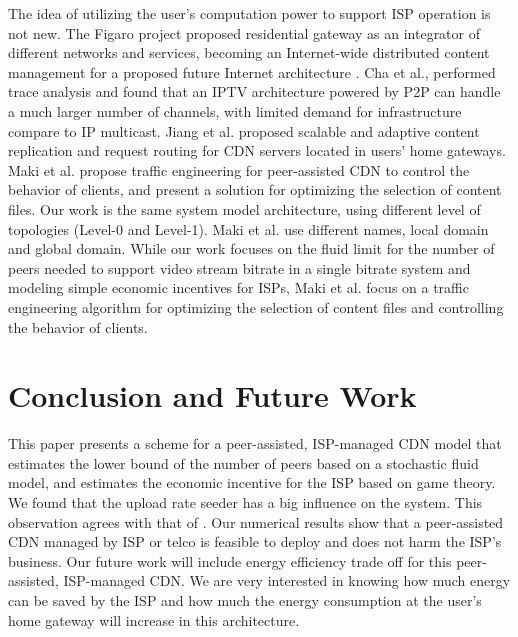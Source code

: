 \documentclass[paper]{ieice}
\begin{document}
The idea of utilizing the user's computation power to support ISP
operation is not new.  The Figaro project \cite{figaro} proposed
residential gateway as an integrator of different networks and
services, becoming an Internet-wide distributed content management for
a proposed future Internet architecture \cite{figaro}.  Cha et
al.,\cite{Cha:2008:NTP:1855641.1855646} performed trace analysis and
found that an IPTV architecture powered by P2P can handle a much
larger number of channels, with limited demand for infrastructure
compare to IP multicast.  Jiang et al.
\cite{Jiang:2012:OMD:2413176.2413193} proposed scalable and adaptive
content replication and request routing for CDN servers located in
users' home gateways.  Maki et al.\cite{NaoyaMAKI2012} propose traffic
engineering for peer-assisted CDN to control the behavior of clients,
and present a solution for optimizing the selection of content files.
Our work is the same system model architecture, using different level
of topologies (Level-0 and Level-1).  Maki et al. use different names,
local domain and global domain.  While our work focuses on the fluid
limit for the number of peers needed to support video stream bitrate
in a single bitrate system and modeling simple economic incentives for
ISPs, Maki et al. focus on a traffic engineering algorithm for
optimizing the selection of content files and controlling the behavior
of clients.

\section{Conclusion and Future Work}\label{conclude}

This paper presents a scheme for a peer-assisted, ISP-managed CDN
model that estimates the lower bound of the number of peers based on a
stochastic fluid model, and estimates the economic incentive for the
ISP based on game theory.  We found that the upload rate seeder has a
big influence on the system.  This observation agrees with that of
\cite{DBLP:journals/corr/abs-1212-4915}.  Our numerical results show
that a peer-assisted CDN managed by ISP or telco is feasible to deploy
and does not harm the ISP's business.  Our future work will include
energy efficiency trade off for this peer-assisted, ISP-managed CDN.
We are very interested in knowing how much energy can be saved by the
ISP and how much the energy consumption at the user's home gateway
will increase in this architecture.
\end{document}
